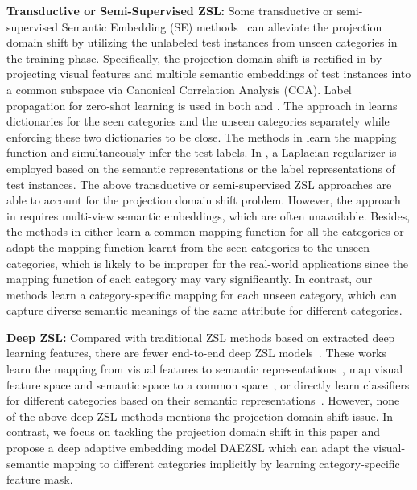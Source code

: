 \documentclass[journal]{IEEEtran}
\begin{document}
\noindent\textbf{Transductive or Semi-Supervised ZSL:} Some transductive or semi-supervised Semantic Embedding (SE) methods~\cite{fu2014transductive, xu2017transductive, kodirov2015unsupervised,shojaee2016semi,li2015max,guo2016transductive,li2015semi,rohrbach2013transfer} can alleviate the projection domain shift by utilizing the unlabeled test instances from unseen categories in the training phase. Specifically, the projection domain shift is rectified in \cite{fu2014transductive} by projecting visual features and multiple semantic embeddings of test instances into a common subspace via Canonical Correlation Analysis (CCA). 
Label propagation for zero-shot learning is used in both \cite{fu2014transductive} and \cite{rohrbach2013transfer}.
The approach in \cite{kodirov2015unsupervised} learns dictionaries for the seen categories and the unseen categories separately while enforcing these two dictionaries to be close. The methods in \cite{li2015max, shojaee2016semi, guo2016transductive, li2015semi} learn the mapping function and simultaneously infer the test labels. In \cite{li2015semi, xu2017transductive}, a Laplacian regularizer is employed based on the semantic representations or the label representations of test instances. The above transductive or semi-supervised ZSL approaches are able to account for the projection domain shift problem. However, the approach in \cite{fu2014transductive} requires multi-view semantic embeddings, which are often unavailable. Besides, the methods in \cite{kodirov2015unsupervised, li2015max, shojaee2016semi, guo2016transductive, li2015semi, xu2017transductive} either learn a common mapping function for all the categories or adapt the mapping function learnt from the seen categories to the unseen categories, which is likely to be improper for the real-world applications since the mapping function of each category may vary significantly. In contrast, our methods learn a category-specific mapping for each unseen category, which can capture diverse semantic meanings of the same attribute for different categories.

\noindent\textbf{Deep ZSL:} Compared with traditional ZSL methods based on extracted deep learning features,  there are fewer end-to-end deep ZSL models~\cite{frome2013devise, socher2013zero, yang2014unified,lei2015predicting,zhang2016learning}. These works learn the mapping from visual features to semantic representations~\cite{socher2013zero}, map visual feature space and  semantic  space  to a common space~\cite{frome2013devise,yang2014unified,zhang2016learning}, or directly learn classifiers for different categories based on their semantic representations~\cite{lei2015predicting}. However, none of the above deep ZSL methods mentions the projection domain shift issue. In contrast, we focus on tackling the projection domain shift in this paper and propose a deep adaptive embedding model DAEZSL which can adapt the visual-semantic mapping to different categories implicitly by learning category-specific feature mask. 
\end{document}

